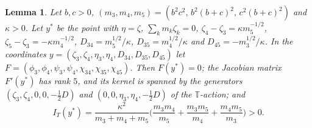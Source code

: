 \documentclass[11pt]{amsart}
\newtheorem{lemma}[theorem]{Lemma}
\theoremstyle{definition}
\theoremstyle{remark}
\begin{document}
{\begin{lemma}\label{lem:d1-mb}
Let $b,c>0$, $(m_3,m_4,m_5)=(b^2c^2,\,b^2(b+c)^2,\,c^2(b+c)^2)$ and $\kappa>0$.  Let $y^*$ be the
point with $\eta=\zeta$, $\sum_km_k\zeta_k=0$, $\zeta_4-\zeta_3=\kappa m_5^{-1/2}$,
$\zeta_5-\zeta_3=-\kappa m_4^{-1/2}$, $D_{34}=m_5^{1/2}/\kappa$, $D_{35}=m_4^{1/2}/\kappa$ and
$D_{45}=-m_3^{1/2}/\kappa$.  In the coordinates $y=(\zeta_3,\zeta_4,\eta_3,\eta_4,D_{34},D_{35},
D_{45})$ let $F=(\phi_3,\phi_4,\psi_3,\psi_4,\chi_{34},\chi_{35},\chi_{45})$.  Then $F(y^*)=0$; the
Jacobian matrix $F'(y^*)$ has rank $5$, and its kernel is spanned by the generators
$(\zeta_3,\zeta_4,0,0,-\frac12D)$ and $(0,0,\eta_3,\eta_4,-\frac12D)$ of the $\mathbb T$-action; and
\[
  I_T(y^*)=\frac{\kappa^2}{m_3+m_4+m_5}\Big(\frac{m_3m_4}{m_5}+\frac{m_3m_5}{m_4}
  +\frac{m_4m_5}{m_3}\Big)>0 .
\]
\end{lemma}}
\end{document}
